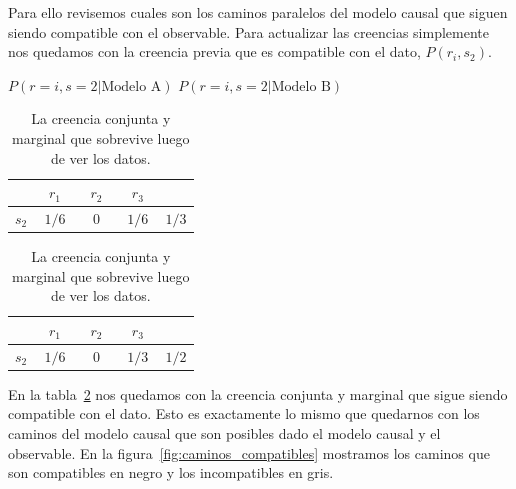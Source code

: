 \documentclass[a4paper,10pt]{book}
\theoremstyle{definition}
\begin{document}
Para ello revisemos cuales son los caminos paralelos del modelo causal que siguen siendo compatible con el observable.
%
Para actualizar las creencias simplemente nos quedamos con la creencia previa que es compatible con el dato, $P(r_i, s_2)$.
%
\begin{table}[ht!]
\centering
$P(r=i, s=2 | \text{Modelo A})$ \hspace{2.7cm} $P(r=i, s=2 | \text{Modelo B})$ \\[0.1cm]
\begin{tabular}{|c|c|c|c||c|} \hline \setlength\tabcolsep{0.4cm}
       & \, $r_1$ \, &  \, $r_2$ \, & \, $r_3$ \, & \\ \hline 
  $s_2$ & $1/6$ & $0$ & $1/6$ & $1/3$ \\ \hline
  \end{tabular}
  \hspace{1.5cm}
  \begin{tabular}{|c|c|c|c||c|} \hline  \setlength\tabcolsep{0.4cm} 
 & \, $r_1$ \, &  \, $r_2$ \, & \, $r_3$ \, & \\ \hline 
  $s_2$ & $1/6$ & $0$ & $1/3$ & $1/2$ \\ \hline
  \end{tabular}
  \caption{La creencia conjunta y marginal que sobrevive luego de ver los datos. }
  \label{tab:creencia_compatible}
\end{table}

En la tabla~\ref{tab:creencia_compatible} nos quedamos con la creencia conjunta y marginal que sigue siendo compatible con el dato.
%
Esto es exactamente lo mismo que quedarnos con los caminos del modelo causal que son posibles dado el modelo causal y el observable.
%
En la figura~\ref{fig:caminos_compatibles} mostramos los caminos que son compatibles en negro y los incompatibles en gris.
\end{document}
